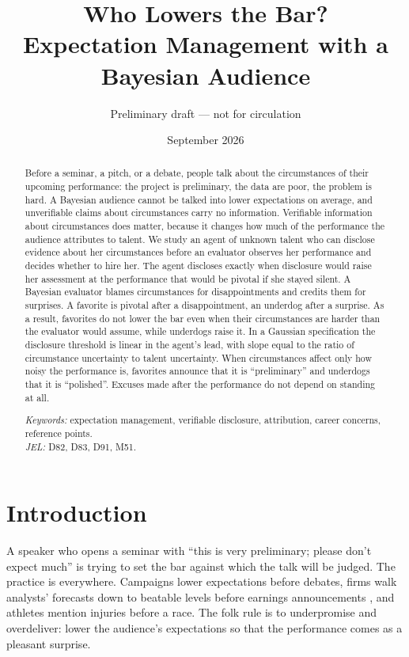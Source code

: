 \documentclass[11pt]{article}
\title{\textbf{Who Lowers the Bar?}\\[4pt]
\large Expectation Management with a Bayesian Audience}
\author{Preliminary draft --- not for circulation}
\date{September 2026}
\theoremstyle{definition}
\begin{document}
\maketitle

\begin{abstract}
\noindent Before a seminar, a pitch, or a debate, people talk about the circumstances of their upcoming performance: the project is preliminary, the data are poor, the problem is hard. A Bayesian audience cannot be talked into lower expectations on average, and unverifiable claims about circumstances carry no information. Verifiable information about circumstances does matter, because it changes how much of the performance the audience attributes to talent. We study an agent of unknown talent who can disclose evidence about her circumstances before an evaluator observes her performance and decides whether to hire her. The agent discloses exactly when disclosure would raise her assessment at the performance that would be pivotal if she stayed silent. A Bayesian evaluator blames circumstances for disappointments and credits them for surprises. A favorite is pivotal after a disappointment, an underdog after a surprise. As a result, favorites do not lower the bar even when their circumstances are harder than the evaluator would assume, while underdogs raise it. In a Gaussian specification the disclosure threshold is linear in the agent's lead, with slope equal to the ratio of circumstance uncertainty to talent uncertainty. When circumstances affect only how noisy the performance is, favorites announce that it is ``preliminary'' and underdogs that it is ``polished''. Excuses made after the performance do not depend on standing at all.

\medskip
\noindent\textit{Keywords:} expectation management, verifiable disclosure, attribution, career concerns, reference points.\\
\textit{JEL:} D82, D83, D91, M51.
\end{abstract}

\newpage

\section{Introduction}

A speaker who opens a seminar with ``this is very preliminary; please don't expect much'' is trying to set the bar against which the talk will be judged. The practice is everywhere. Campaigns lower expectations before debates, firms walk analysts' forecasts down to beatable levels before earnings announcements \citep{Matsumoto2002,RichardsonTeohWysocki2004}, and athletes mention injuries before a race. The folk rule is to underpromise and overdeliver: lower the audience's expectations so that the performance comes as a pleasant surprise.
\end{document}
